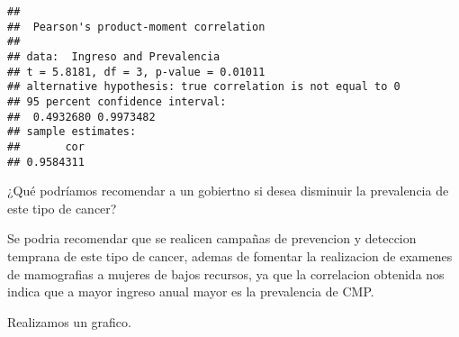 \documentclass[
]{article}
\begin{document}
\begin{verbatim}
## 
##  Pearson's product-moment correlation
## 
## data:  Ingreso and Prevalencia
## t = 5.8181, df = 3, p-value = 0.01011
## alternative hypothesis: true correlation is not equal to 0
## 95 percent confidence interval:
##  0.4932680 0.9973482
## sample estimates:
##       cor 
## 0.9584311
\end{verbatim}

¿Qué podríamos recomendar a un gobiertno si desea disminuir la
prevalencia de este tipo de cancer?

Se podria recomendar que se realicen campañas de prevencion y deteccion
temprana de este tipo de cancer, ademas de fomentar la realizacion de
examenes de mamografias a mujeres de bajos recursos, ya que la
correlacion obtenida nos indica que a mayor ingreso anual mayor es la
prevalencia de CMP.

Realizamos un grafico.
\end{document}
